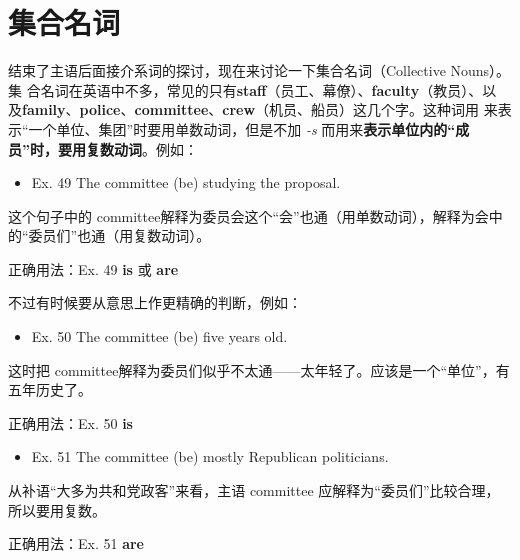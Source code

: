 \documentclass{yufa}
\begin{document}
\section{集合名词}

结束了主语后面接介系词的探讨，现在来讨论一下集合名词（Collective Nouns）。集
合名词在英语中不多，常见的只有\textbf{staff}（员工、幕僚）、\textbf{faculty}（教员）、以
及\textbf{family}、\textbf{police}、\textbf{committee}、\textbf{crew}（机员、船员）这几个字。这种词用
来表示“一个单位、集团”时要用单数动词，但是不加 \emph{-s} 而用来\textbf{表示单位内的“成
  员”时，要用复数动词}。例如：

\begin{mybox}
\begin{itemize}
\item   Ex. 49 The committee (be) studying the proposal.
\end{itemize}

这个句子中的 committee解释为委员会这个“会”也通（用单数动词），解释为会中
的“委员们”也通（用复数动词）。

\tcblower

正确用法：Ex. 49 \textbf{is} 或 \textbf{are}
\end{mybox}

不过有时候要从意思上作更精确的判断，例如：
\begin{mybox}

\begin{itemize}
\item   Ex. 50 The committee (be) five years old.
\end{itemize}

这时把 committee解释为委员们似乎不太通——太年轻了。应该是一个“单位”，有
五年历史了。

\tcblower

正确用法：Ex. 50 \textbf{is}
\end{mybox}


\begin{mybox}

\begin{itemize}
\item   Ex. 51 The committee (be) mostly Republican politicians.
\end{itemize}

从补语“大多为共和党政客”来看，主语 committee
应解释为“委员们”比较合理，所以要用复数。

\tcblower

正确用法：Ex. 51 \textbf{are}
\end{mybox}
\end{document}
